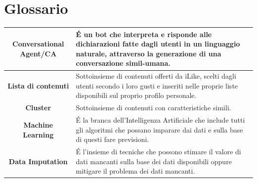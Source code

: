 \documentclass[a4paper, 10pt]{report}
\begin{document}
    \chapter{Glossario}\label{ch:glossario}
        \begin{adjustbox}{width=\columnwidth,center}
            \begin{tabular}{|c|p{8cm}|}
                \hline \textbf{Conversational Agent/CA} & É un bot che interpreta e risponde alle dichiarazioni fatte dagli utenti
                in un linguaggio naturale, attraverso la  generazione di una conversazione simil-umana.\\
                \hline \textbf{Lista di contenuti} & Sottoinsieme di contenuti offerti da iLike, scelti dagli utenti secondo i loro gusti
                e inseriti nelle proprie liste disponibili sul proprio profilo personale.\\
                \hline \textbf{Cluster} & Sottoinsieme di contenuti con caratteristiche simili.\\
                \hline \textbf{Machine Learning} & É la branca dell'Intelligenza Artificiale che include tutti gli algoritmi
                        che possano imparare dai dati e sulla base di questi fare previsioni.\\
                \hline \textbf{Data Imputation} & É l'insieme di tecniche che possono stimare il valore di dati mancanti
                        sulla base dei dati disponibili oppure mitigare il problema dei dati mancanti.\\
                \hline
            \end{tabular}
        \end{adjustbox}
\end{document}
